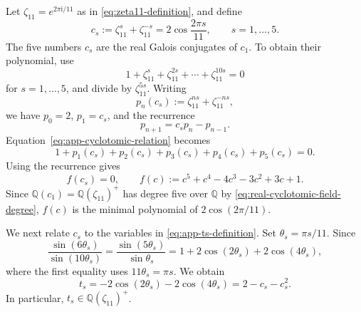 \documentclass[11pt,a4paper]{article}
\numberwithin{equation}{section}
\begin{document}
Let $\zeta_{11}=e^{2\pi\mathrm{i}/11}$ as in \eqref{eq:zeta11-definition}, and define
\begin{equation}
  c_s:=\zeta_{11}^s+\zeta_{11}^{-s}
  =2\cos\frac{2\pi s}{11},
  \qquad s=1,\ldots,5.
  \label{eq:app-cs-definition}
\end{equation}
The five numbers $c_s$ are the real Galois conjugates of $c_1$.  To obtain their polynomial, use
\begin{equation}
  1+\zeta_{11}^s+\zeta_{11}^{2s}+\cdots+\zeta_{11}^{10s}=0
  \label{eq:app-cyclotomic-relation}
\end{equation}
for $s=1,\ldots,5$, and divide by $\zeta_{11}^{5s}$.  Writing
\begin{equation}
  p_n(c_s):=\zeta_{11}^{ns}+\zeta_{11}^{-ns},
\end{equation}
we have $p_0=2$, $p_1=c_s$, and the recurrence
\begin{equation}
  p_{n+1}=c_s p_n-p_{n-1}.
  \label{eq:app-Chebyshev-recurrence}
\end{equation}
Equation~\eqref{eq:app-cyclotomic-relation} becomes
\begin{equation}
  1+p_1(c_s)+p_2(c_s)+p_3(c_s)+p_4(c_s)+p_5(c_s)=0.
\end{equation}
Using the recurrence gives
\begin{equation}
  f(c_s)=0,
  \qquad
  f(c):=c^5+c^4-4c^3-3c^2+3c+1.
  \label{eq:app-real-cyclotomic-polynomial}
\end{equation}
Since $\mathbb Q(c_1)=\mathbb Q(\zeta_{11})^+$ has degree five over $\mathbb Q$ by \eqref{eq:real-cyclotomic-field-degree}, $f(c)$ is the minimal polynomial of $2\cos(2\pi/11)$.

We next relate $c_s$ to the variables in \eqref{eq:app-ts-definition}.  Set $\theta_s=\pi s/11$.  Since
\begin{equation}
  \frac{\sin(6\theta_s)}{\sin(10\theta_s)}
  =\frac{\sin(5\theta_s)}{\sin\theta_s}
  =1+2\cos(2\theta_s)+2\cos(4\theta_s),
\end{equation}
where the first equality uses $11\theta_s=\pi s$.  We obtain
\begin{equation}
  t_s
  =-2\cos(2\theta_s)-2\cos(4\theta_s)
  =2-c_s-c_s^2.
  \label{eq:app-t-c-relation}
\end{equation}
In particular, $t_s\in\mathbb Q(\zeta_{11})^+$.
\end{document}
